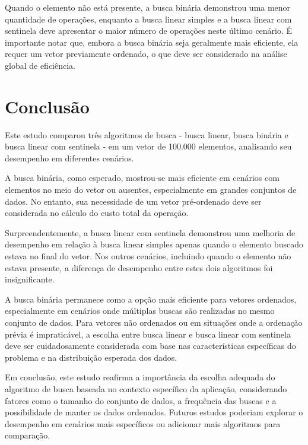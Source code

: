 \documentclass[12pt]{article}
\begin{document}
Quando o elemento não está presente, a busca binária demonstrou uma menor quantidade de operações, enquanto a busca linear simples e a busca linear com sentinela deve apresentar o maior número de operações neste último cenário. É importante notar que, embora a busca binária seja geralmente mais eficiente, ela requer um vetor previamente ordenado, o que deve ser considerado na análise global de eficiência.


\section{Conclusão}

Este estudo comparou três algoritmos de busca - busca linear, busca binária e busca linear com sentinela - em um vetor de 100.000 elementos, analisando seu desempenho em diferentes cenários.

A busca binária, como esperado, mostrou-se mais eficiente em cenários com elementos no meio do vetor ou ausentes, especialmente em grandes conjuntos de dados. No entanto, sua necessidade de um vetor pré-ordenado deve ser considerada no cálculo do custo total da operação.

Surpreendentemente, a busca linear com sentinela demonstrou uma melhoria de desempenho em relação à busca linear simples apenas quando o elemento buscado estava no final do vetor. Nos outros cenários, incluindo quando o elemento não estava presente, a diferença de desempenho entre estes dois algoritmos foi insignificante.

A busca binária permanece como a opção mais eficiente para vetores ordenados, especialmente em cenários onde múltiplas buscas são realizadas no mesmo conjunto de dados. Para vetores não ordenados ou em situações onde a ordenação prévia é impraticável, a escolha entre busca linear e busca linear com sentinela deve ser cuidadosamente considerada com base nas características específicas do problema e na distribuição esperada dos dados.

Em conclusão, este estudo reafirma a importância da escolha adequada do algoritmo de busca baseada no contexto específico da aplicação, considerando fatores como o tamanho do conjunto de dados, a frequência das buscas e a possibilidade de manter os dados ordenados. Futuros estudos poderiam explorar o desempenho em cenários mais específicos ou adicionar mais algoritmos para comparação.

%
%
\end{document}
